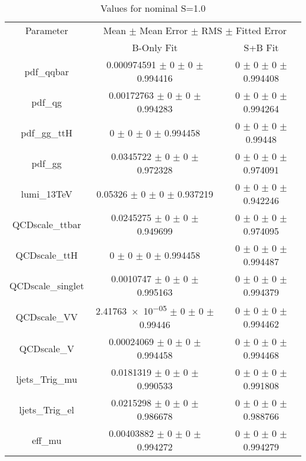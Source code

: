 \begin{table}
\centering
\caption{Values for nominal S=1.0}
\begin{tabular}{ccc}
\toprule
Parameter & \multicolumn{2}{c}{Mean $\pm$ Mean Error $\pm$ RMS $\pm$ Fitted Error}\\
 & B-Only Fit & S+B Fit\\
\midrule
pdf\_qqbar & \num{0.000974591} $\pm$ \num{0} $\pm$ \num{0} $\pm$ \num{0.994416} & \num{0} $\pm$ \num{0} $\pm$ \num{0} $\pm$ \num{0.994408}\\
pdf\_qg & \num{0.00172763} $\pm$ \num{0} $\pm$ \num{0} $\pm$ \num{0.994283} & \num{0} $\pm$ \num{0} $\pm$ \num{0} $\pm$ \num{0.994264}\\
pdf\_gg\_ttH & \num{0} $\pm$ \num{0} $\pm$ \num{0} $\pm$ \num{0.994458} & \num{0} $\pm$ \num{0} $\pm$ \num{0} $\pm$ \num{0.99448}\\
pdf\_gg & \num{0.0345722} $\pm$ \num{0} $\pm$ \num{0} $\pm$ \num{0.972328} & \num{0} $\pm$ \num{0} $\pm$ \num{0} $\pm$ \num{0.974091}\\
lumi\_13TeV & \num{0.05326} $\pm$ \num{0} $\pm$ \num{0} $\pm$ \num{0.937219} & \num{0} $\pm$ \num{0} $\pm$ \num{0} $\pm$ \num{0.942246}\\
QCDscale\_ttbar & \num{0.0245275} $\pm$ \num{0} $\pm$ \num{0} $\pm$ \num{0.949699} & \num{0} $\pm$ \num{0} $\pm$ \num{0} $\pm$ \num{0.974095}\\
QCDscale\_ttH & \num{0} $\pm$ \num{0} $\pm$ \num{0} $\pm$ \num{0.994458} & \num{0} $\pm$ \num{0} $\pm$ \num{0} $\pm$ \num{0.994487}\\
QCDscale\_singlet & \num{0.0010747} $\pm$ \num{0} $\pm$ \num{0} $\pm$ \num{0.995163} & \num{0} $\pm$ \num{0} $\pm$ \num{0} $\pm$ \num{0.994379}\\
QCDscale\_VV & \num{2.41763e-05} $\pm$ \num{0} $\pm$ \num{0} $\pm$ \num{0.99446} & \num{0} $\pm$ \num{0} $\pm$ \num{0} $\pm$ \num{0.994462}\\
QCDscale\_V & \num{0.00024069} $\pm$ \num{0} $\pm$ \num{0} $\pm$ \num{0.994458} & \num{0} $\pm$ \num{0} $\pm$ \num{0} $\pm$ \num{0.994468}\\
ljets\_Trig\_mu & \num{0.0181319} $\pm$ \num{0} $\pm$ \num{0} $\pm$ \num{0.990533} & \num{0} $\pm$ \num{0} $\pm$ \num{0} $\pm$ \num{0.991808}\\
ljets\_Trig\_el & \num{0.0215298} $\pm$ \num{0} $\pm$ \num{0} $\pm$ \num{0.986678} & \num{0} $\pm$ \num{0} $\pm$ \num{0} $\pm$ \num{0.988766}\\
eff\_mu & \num{0.00403882} $\pm$ \num{0} $\pm$ \num{0} $\pm$ \num{0.994272} & \num{0} $\pm$ \num{0} $\pm$ \num{0} $\pm$ \num{0.994279}\\

\end{tabular}
\end{table}
